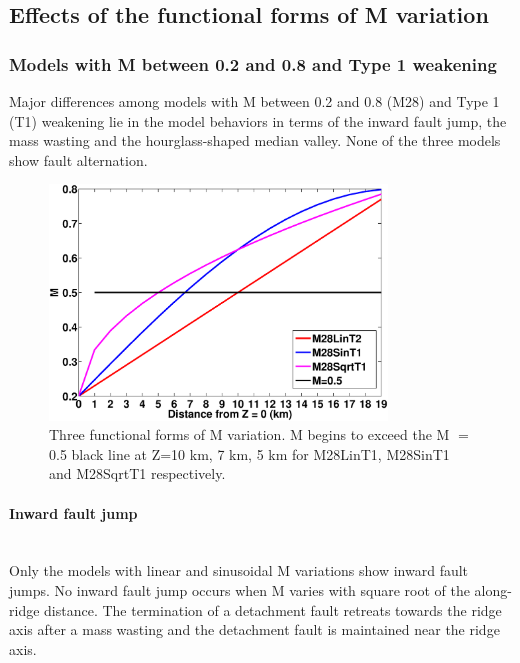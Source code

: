 \subsection{Effects of the functional forms of M variation}

\subsubsection{Models with M between 0.2 and 0.8 and Type 1 weakening}

Major differences among models with M between 0.2 and 0.8 (M28) and Type 1 (T1) weakening lie in the model behaviors in terms of the inward fault jump, the mass wasting and the hourglass-shaped median valley. None of the three models show fault alternation.    

\begin{figure}[h]
  \centering
    \includegraphics[width=0.8\textwidth]{./Figures/fig_Results_3_3_M_variation.eps}
  \caption{Three functional forms of M variation. M begins to exceed the M $=$ 0.5 black line at Z=10 km, 7 km, 5 km for M28LinT1, M28SinT1 and M28SqrtT1 respectively.}
 \label{fig_Results3_1}
\end{figure}   

\paragraph{Inward fault jump}\label{para_InwardFaultJump}
~\\
Only the models with linear and sinusoidal M variations show inward fault jumps. No inward fault jump occurs when M varies with square root of the along-ridge distance. The termination of a detachment fault retreats towards the ridge axis after a mass wasting and the detachment fault is maintained near the ridge axis.


